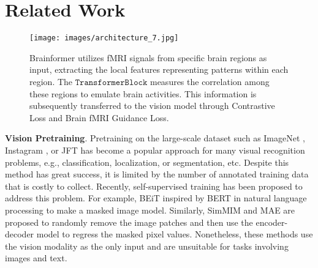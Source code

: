 \section{Related Work}
\label{sec:related_work}






\begin{figure*}[!t]
    \centering
    \texttt{[image: images/architecture\_7.jpg]}
    \vspace{-2mm}
    \caption{Brainformer utilizes fMRI signals from specific brain regions as input, extracting the local features representing patterns within each region. The $\texttt{TransformerBlock}$ measures the correlation among these regions to emulate brain activities. This information is subsequently transferred to the vision model through Contrastive Loss and Brain fMRI Guidance Loss.}
    \label{fig:brainformer}
    \vspace{-4mm}
\end{figure*}



\noindent
\textbf{Vision Pretraining}. Pretraining on the large-scale dataset such as ImageNet \cite{imagenet}, Instagram \cite{mahajan2018exploring}, or JFT \cite{zhai2022scaling} has become a popular approach for many visual recognition problems, e.g., classification, localization, or segmentation, etc. Despite this method has great success, it is limited by the number of annotated training data that is costly to collect. Recently, self-supervised training has been proposed to address this problem. For example, BEiT \cite{bao2021beit} inspired by BERT \cite{BERT} in natural language processing to make a masked image model. Similarly, SimMIM \cite{xie2022simmim} and MAE are proposed to randomly remove the image patches and then use the encoder-decoder model to regress the masked pixel values. Nonetheless, these methods use the vision modality as the only input and are unsuitable for tasks involving images and text.

